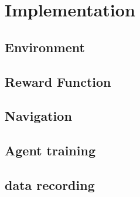 \section{Implementation}

\subsection{Environment}

\subsection{Reward Function}

\subsection{Navigation}

\subsection{Agent training}

\subsection{data recording}

